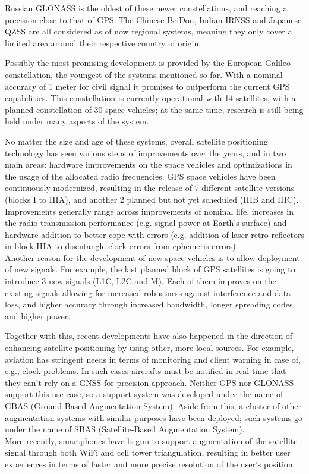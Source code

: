 Russian GLONASS is the oldest of these newer constellations, and reaching a
precision close to that of GPS. The Chinese BeiDou, Indian IRNSS and Japanese
QZSS are all considered as of now regional systems, meaning they only cover a
limited area around their respective country of origin.

Possibly the most promising development is provided by the European Galileo
constellation, the youngest of the systems mentioned so far. With a nominal
accuracy of 1 meter for civil signal it promises to outperform the current GPS
capabilities. This constellation is currently operational with 14 satellites,
with a planned constellation of 30 space vehicles; at the same time, research is
still being held under many aspects of the system.

No matter the size and age of these systems, overall satellite positioning
technology has seen various steps of improvements over the years, and in two
main areas: hardware improvements on the space vehicles and optimizations in the
usage of the allocated radio frequencies. GPS space vehicles have been
continuously modernized, resulting in the release of 7 different satellite
versions (blocks I to IIIA), and another 2 planned but not yet scheduled (IIIB
and IIIC). Improvements generally range across improvements of nominal life,
increases in the radio transmission performance (e.g. signal power at Earth's
surface) and hardware addition to better cope with errors (e.g. addition of
laser retro-reflectors in block IIIA to disentangle clock errors from ephemeris
errors). \\ 
Another reason for the development of new space vehicles is to allow
deployment of new signals. For example, the last planned block of GPS satellites
is going to introduce 3 new signals (L1C, L2C and M). Each of them improves
on the existing signals allowing for increased robustness against interference
and data loss, and higher accuracy through increased bandwidth, longer spreading
codes and higher power.

Together with this, recent developments have also happened in the direction of
enhancing satellite positioning by using other, more local sources. For example,
aviation has stringent needs in terms of monitoring and client warning in case
of, e.g., clock problems. In such cases aircrafts must be notified in real-time
that they can't rely on a GNSS for precision approach. Neither GPS nor GLONASS
support this use case, so a support system was developed under the name of GBAS
(Ground-Based Augmentation System). Aside from this, a cluster of other
augmentation systems with similar purposes have been deployed; such systems go
under the name of SBAS (Satellite-Based Augmentation System).\\
More recently, smartphones have begun to support augmentation of the satellite
signal through both WiFi and cell tower triangulation, resulting in better user
experiences in terms of faster and more precise resolution of the user's
position.

